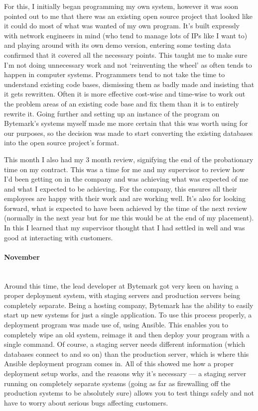 \documentclass[12pt,a4paper]{article}
\newcommand{\paragraphnl}[1]{\paragraph{#1}\mbox{}\\}
\begin{document}
	For this, I initially began programming my own system, however it was soon
	pointed out to me that there was an existing open source project that
	looked like it could do most of what was wanted of my own program. It's
	built expressly with network engineers in mind (who	tend to manage lots of
	IPs like I want to) and playing around with its own demo version, entering
	some testing data confirmed	that it covered all the necessary points. This
	taught me to make sure I'm not doing unnecessary work and not `reinventing
	the wheel' as often tends to happen in computer systems. Programmers tend
	to not take the time to understand existing code bases, dismissing them as
	badly made and insisting that it gets rewritten. Often it is more effective
	cost-wise and time-wise to work out the problem areas of an existing code
	base and fix them than it is to entirely rewrite it. Going further and
	setting up an instance of the program on Bytemark's systems myself made me
	more certain that this was worth using for our purposes, so the decision
	was made to start converting the existing databases into the open source
	project's format.

	This month I also had my 3 month review, signifying the end of the
	probationary time on my contract. This was a time for me and my supervisor
	to review how I'd been getting on in the company and was achieving what was
	expected of me and what I expected to be achieving. For the company, this
	ensures all their employees are happy with their work and are working well.
	It's also for looking forward, what is expected to have been achieved by
	the time of the next review (normally in the next year but for me this
	would be at the end of my placement). In this I learned that my supervisor
	thought that I had settled in well and was good at interacting with
	customers.

\paragraphnl{November}
	Around this time, the lead developer at Bytemark got very keen on having a
	proper deployment system, with staging servers and production servers
	being completely separate. Being a hosting company, Bytemark has the
	ability to easily start up new systems for just a single application. To
	use this process properly, a deployment program was made use of, using
	Ansible. This enables you to completely wipe an old system, reimage it and
	then deploy your program with a single command. Of course, a staging server
	needs different information (which databases connect to and so on) than the
	production server, which is where this Ansible deployment program comes in.
	All of this showed me how a proper deployment setup works, and the reasons
	why it's necessary --- a staging server running on completely separate
	systems (going as far as firewalling off the production systems to be
	absolutely sure) allows you to test things safely and not have to worry
	about serious bugs affecting customers.
\end{document}
